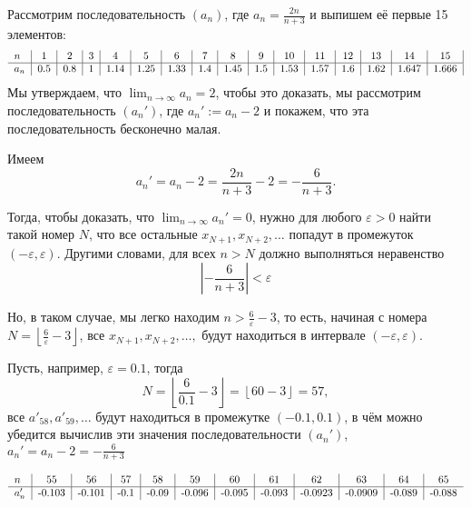 \begin{example}
    Рассмотрим последовательность $(a_n)$, где $a_n = \frac{2n}{n+3}$ и выпишем её первые 15 элементов:
        \[
         \begin{tabular}{l|c|c|c|c|c|c|c|c|c|c|c|c|c|c|c|}
             $n$ & 1&2&3&4&5&6&7&8&9&10&11&12&13&14&15  \\
             \hline
             $a_n$&  0.5 & 0.8 & 1 & 1.14 & 1.25 & 1.33& 1.4 & 1.45 & 1.5 & 1.53 & 1.57 & 1.6 & 1.62 & 1.647 & 1.666
         \end{tabular}
        \]
Мы утверждаем, что $\lim_{n\to \infty}a_n =2$, чтобы это доказать, мы рассмотрим последовательность $(a_n')$, где $a_n' := a_n  -2$ и покажем, что эта последовательность бесконечно малая.

Имеем
\[
 a_n'=a_n -2= \frac{ 2n}{n+3} -2 = - \frac{6}{n+3}.
\]

Тогда, чтобы доказать, что $\lim_{n\to \infty } a_n' = 0$, нужно для любого $\varepsilon >0$ найти такой номер $N$, что все остальные $x_{N+1}, x_{N+2}, \ldots$ попадут в промежуток $(-\varepsilon, \varepsilon)$. Другими словами, для всех $n>N$ должно выполняться неравенство
\[
  \left|-\frac{6}{n+3}\right|<\varepsilon
\]

Но, в таком случае, мы легко находим $n> \frac{6}{\varepsilon} - 3$, то есть, начиная с номера $N= \left\lfloor \frac{6}{\varepsilon} - 3 \right\rfloor$, все $x_{N+1}, x_{N+2}, \ldots,$ будут находиться в интервале $(-\varepsilon, \varepsilon).$

Пусть, например, $\varepsilon = 0.1$, тогда
\[
 N =\left\lfloor \frac{6}{0.1} - 3 \right\rfloor = \left\lfloor 60 - 3 \right\rfloor = 57,
\]
\ie все $a'_{58},a'_{59}, \ldots$ будут находиться в промежутке $(-0.1, 0.1)$, в чём можно убедится вычислив эти значения последовательности $(a_n')$, $a_n' = a_n - 2 = -\frac{6}{n+3}$

  \[
         \begin{tabular}{l|c|c|c|c|c|c|c|c|c|c|c}
             $n$ & 55& 56 & 57 &58 &59 & 60 &61 &62 &63 &64 &65 \\
             \hline
             $a'_n$&  -0.103 & -0.101 & -0.1 & -0.09 & -0.096 & -0.095& -0.093 & -0.0923 & -0.0909& -0.089 & -0.088
         \end{tabular}
        \]
\end{example}

